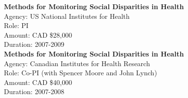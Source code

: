 \documentclass[
  letterpaper,
  DIV=11,
  numbers=noendperiod]{scrartcl}
\begin{document}
\textbf{Methods for Monitoring Social Disparities in Health}\\
\hspace*{0.333em}\hspace*{0.333em}\hspace*{0.333em}\hspace*{0.333em}Agency:
US National Institutes for Health\\
\hspace*{0.333em}\hspace*{0.333em}\hspace*{0.333em}\hspace*{0.333em}Role:
PI\\
\hspace*{0.333em}\hspace*{0.333em}\hspace*{0.333em}\hspace*{0.333em}Amount:
CAD \$28,000\\
\hspace*{0.333em}\hspace*{0.333em}\hspace*{0.333em}\hspace*{0.333em}Duration:
2007-2009\\

\textbf{Methods for Monitoring Social Disparities in Health}\\
\hspace*{0.333em}\hspace*{0.333em}\hspace*{0.333em}\hspace*{0.333em}Agency:
Canadian Institutes for Health Research\\
\hspace*{0.333em}\hspace*{0.333em}\hspace*{0.333em}\hspace*{0.333em}Role:
Co-PI (with Spencer Moore and John Lynch)\\
\hspace*{0.333em}\hspace*{0.333em}\hspace*{0.333em}\hspace*{0.333em}Amount:
CAD \$40,000\\
\hspace*{0.333em}\hspace*{0.333em}\hspace*{0.333em}\hspace*{0.333em}Duration:
2007-2008\\
\end{document}
